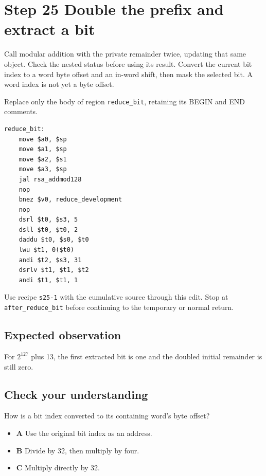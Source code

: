 \section{Step 25 Double the prefix and extract a bit}\label{rsa-s25}

Call modular addition with the private remainder twice, updating that same object. Check the nested status before using its result. Convert the current bit index to a word byte offset and an in-word shift, then mask the selected bit. A word index is not yet a byte offset.

Replace only the body of region \texttt{reduce\_bit}, retaining its BEGIN and END comments.

\begin{verbatim}
reduce_bit:
    move $a0, $sp
    move $a1, $sp
    move $a2, $s1
    move $a3, $sp
    jal rsa_addmod128
    nop
    bnez $v0, reduce_development
    nop
    dsrl $t0, $s3, 5
    dsll $t0, $t0, 2
    daddu $t0, $s0, $t0
    lwu $t1, 0($t0)
    andi $t2, $s3, 31
    dsrlv $t1, $t1, $t2
    andi $t1, $t1, 1
\end{verbatim}

Use recipe \texttt{s25-1} with the cumulative source through this edit. Stop at \texttt{after\_reduce\_bit} before continuing to the temporary or normal return.

\subsection{Expected observation}
For \(2^{127}\) plus 13, the first extracted bit is one and the doubled initial remainder is still zero.

\subsection{Check your understanding}
How is a bit index converted to its containing word's byte offset?

\begin{itemize}
\item \textbf{A} Use the original bit index as an address.
\item \textbf{B} Divide by 32, then multiply by four.
\item \textbf{C} Multiply directly by 32.
\end{itemize}
